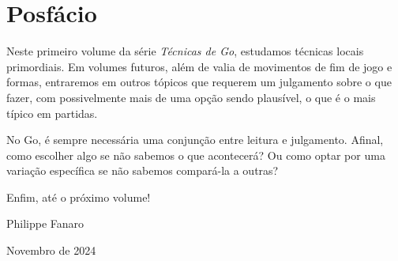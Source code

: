 \chapter{Posfácio}

Neste primeiro volume da série \emph{Técnicas de Go}, estudamos técnicas locais primordiais. Em volumes futuros, além de valia de movimentos de fim de jogo e formas, entraremos em outros tópicos que requerem um julgamento sobre o que fazer, com possivelmente mais de uma opção sendo plausível, o que é o mais típico em partidas.

No Go, é sempre necessária uma conjunção entre leitura e julgamento. Afinal, como escolher algo se não sabemos o que acontecerá? Ou como optar por uma variação específica se não sabemos compará-la a outras?

\bigskip
\bigskip
\smallskip
\smallskip

Enfim, até o próximo volume!

\bigskip
\bigskip
\smallskip
\smallskip
\smallskip

\hspace*{\fill} Philippe Fanaro \hspace{0.02cm}

\hspace*{\fill} Novembro de 2024